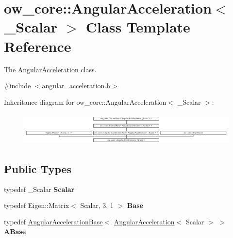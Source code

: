 \hypertarget{classow__core_1_1AngularAcceleration}{}\section{ow\+\_\+core\+:\+:Angular\+Acceleration$<$ \+\_\+\+Scalar $>$ Class Template Reference}
\label{classow__core_1_1AngularAcceleration}


The \hyperlink{classow__core_1_1AngularAcceleration}{Angular\+Acceleration} class.  




{\ttfamily \#include $<$angular\+\_\+acceleration.\+h$>$}

Inheritance diagram for ow\+\_\+core\+:\+:Angular\+Acceleration$<$ \+\_\+\+Scalar $>$\+:\begin{figure}[H]
\begin{center}
\leavevmode
\includegraphics[height=1.740482cm]{d2/d33/classow__core_1_1AngularAcceleration}
\end{center}
\end{figure}
\subsection*{Public Types}
\begin{DoxyCompactItemize}
\item 
typedef \+\_\+\+Scalar {\bfseries Scalar}\hypertarget{classow__core_1_1AngularAcceleration_ae8780d9abd70134aef459b9bf3b4a414}{}\label{classow__core_1_1AngularAcceleration_ae8780d9abd70134aef459b9bf3b4a414}

\item 
typedef Eigen\+::\+Matrix$<$ Scalar, 3, 1 $>$ {\bfseries Base}\hypertarget{classow__core_1_1AngularAcceleration_a20ac359ddcc790fa246b945a225c6ee0}{}\label{classow__core_1_1AngularAcceleration_a20ac359ddcc790fa246b945a225c6ee0}

\item 
typedef \hyperlink{classow__core_1_1AngularAccelerationBase}{Angular\+Acceleration\+Base}$<$ \hyperlink{classow__core_1_1AngularAcceleration}{Angular\+Acceleration}$<$ Scalar $>$ $>$ {\bfseries A\+Base}\hypertarget{classow__core_1_1AngularAcceleration_a8f18a4ac6f77445cacb55390551d56a6}{}\label{classow__core_1_1AngularAcceleration_a8f18a4ac6f77445cacb55390551d56a6}

\end{DoxyCompactItemize}
